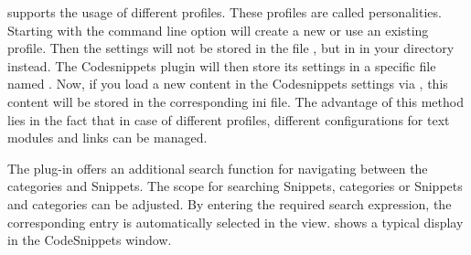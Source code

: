 \codeblocks supports the usage of different profiles. These profiles are called personalities. Starting \codeblocks with the command line option  will create a new or use an existing profile. Then the settings will not be stored in the file , but in  in your  directory instead. The Codesnippets plugin will then store its settings in a specific file named . Now, if you load a new content  in the Codesnippets settings via , this content will be stored in the corresponding ini file. The advantage of this method lies in the fact that in case of different profiles, different configurations for text modules and links can be managed.

The plug-in offers an additional search function for navigating between the categories and Snippets. The scope for searching Snippets, categories or Snippets and categories can be adjusted. By entering the required search expression, the corresponding entry is automatically selected in the view.  shows a typical display in the CodeSnippets window.

\begin{samepage}

\end{samepage}